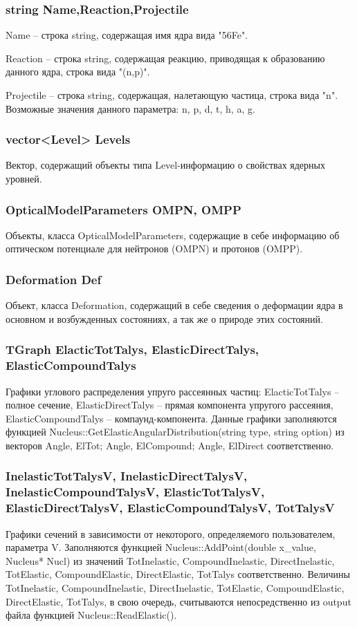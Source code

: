 \documentclass[a4paper,12pt]{extarticle}
\begin{document}
\subsubsection{string Name,Reaction,Projectile}
Name -- строка string, содержащая имя ядра вида "56Fe".

Reaction -- строка string, содержащая реакцию, приводящая к образованию данного ядра, строка вида "(n,p)".

Projectile -- строка string, содержащая, налетающую частица, строка вида "n". Возможные значения данного параметра: n, p, d, t, h, a, g.
\subsubsection{vector<Level> Levels}
Вектор, содержащий объекты типа Level-информацию о свойствах ядерных уровней.
\subsubsection{OpticalModelParameters OMPN, OMPP}
Объекты, класса OpticalModelParameters, содержащие в себе информацию об оптическом потенциале для нейтронов (OMPN) и протонов (OMPP).
\subsubsection{Deformation Def}
Объект, класса Deformation, содержащий в себе сведения о деформации ядра в основном и возбужденных состояниях, а так же о природе этих состояний.
\subsubsection{TGraph ElacticTotTalys, ElasticDirectTalys, ElasticCompoundTalys}
Графики углового распределения упруго рассеянных частиц:  ElacticTotTalys -- полное сечение, ElasticDirectTalys -- прямая компонента упругого рассеяния, ElasticCompoundTalys -- компаунд-компонента. Данные графики заполняются функцией Nucleus::GetElasticAngularDistribution(string type, string option) из векторов Angle, ElTot; Angle, ElCompound; Angle, ElDirect соответственно.
\subsubsection{InelasticTotTalysV, InelasticDirectTalysV, InelasticCompoundTalysV, ElasticTotTalysV, ElasticDirectTalysV, ElasticCompoundTalysV, TotTalysV}
Графики сечений в зависимости от некоторого, определяемого пользователем, параметра V. Заполняются функцией Nucleus::AddPoint(double x_value, Nucleus* Nucl) из значений TotInelastic, CompoundInelastic, DirectInelastic, TotElastic, CompoundElastic, DirectElastic,  TotTalys соответственно. Величины TotInelastic, CompoundInelastic, DirectInelastic, TotElastic, CompoundElastic, DirectElastic,  TotTalys, в свою очередь, считываются непосредственно из output файла функцией Nucleus::ReadElastic().
\end{document}
